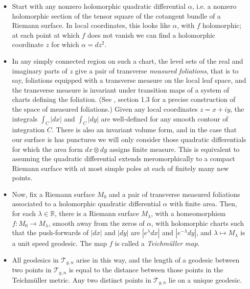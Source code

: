 \documentclass[12pt]{article}
\newcommand{\rr}{\mathbb{R}}
\begin{document}
\begin{itemize}
\item Start with any nonzero holomorphic quadratic differential $\alpha$, i.e. a nonzero holomorphic section of the tensor square of the cotangent bundle of a Riemann surface. In local coordinates, this looks like $\alpha$, with $f$ holomorphic; at each point at which $f$ does not vanish we can find a holomorphic coordinate $z$ for which $\alpha = dz^2$.\\

\item In any simply connected region on such a chart, the level sets of the real and imaginary parts of $z$ give a pair of transverse \emph{measured foliations}, that is to say, foliations equipped with a transverse measure on the local leaf space, and the transverse measure is invariant under transition maps of a system of charts defining the foliation. (See \cite {FLP}, section 1.3 for a precise construction of the space of measured foliations.) Given any local coordinates $z = x + iy$, the integrals $\int_C |dx|$ and $\int_C |dy|$ are well-defined for any smooth contour of integration $C$. There is also an invariant volume form, and in the case that our surface is has punctures we will only consider those quadratic differentials for which the area form $dx \otimes dy$ assigns finite measure. This is equivalent to assuming the quadratic differential extends meromorphically to a compact Riemann surface with at most simple poles at each of finitely many new points.\\

\item Now, fix a Riemann surface $M_0$ and a pair of transverse measured foliations associated to a holomorphic quadratic differential $\alpha$ with finite area. Then, for each $\lambda \in \rr$, there is a Riemann surface $M_\lambda$, with a homeomorphism $f: M_0 \to M_\lambda$, smooth away from the zeros of $\alpha$, with holomorphic charts such that the push-forwards of $|dx|$ and $|dy|$ are $|e^\lambda dx|$ and $|e^{-\lambda} dy|$, and $\lambda \mapsto M_\lambda$ is a unit speed geodesic. The map $f$ is called a \emph{Teichm\"uller map}.\\

\item All geodesics in $\mathcal{T}_{g,n}$ arise in this way, and the length of a geodesic between two points in $\mathcal{T}_{g,n}$ is equal to the distance between those points in the Teichm\"uller metric. Any two distinct points in $\mathcal{T}_{g,n}$ lie on a unique geodesic. \end{itemize}
\end{document}
